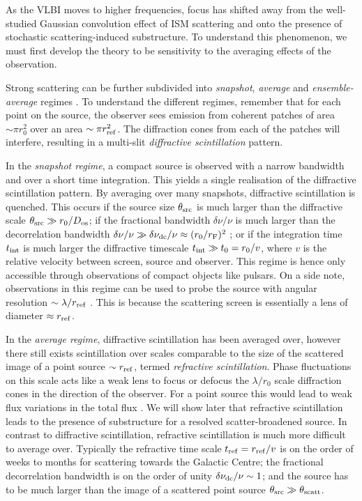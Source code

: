 As the VLBI moves to higher frequencies, focus has shifted away from the well-studied Gaussian convolution effect of ISM scattering and onto the presence of stochastic scattering-induced substructure. To understand this phenomenon, we must first develop the theory to be sensitivity to the averaging effects of the observation. 

Strong scattering can be further subdivided into \emph{snapshot}, \emph{average} and \emph{ensemble-average} regimes \citep*{Narayan_1989,Goodman_1989}. To understand the different regimes, remember that for each point on the source, the observer sees emission from coherent patches of area $\sim \pi r_0^2$ over an area $\sim \pi r_{\rm ref}^2$. The diffraction cones from each of the patches will interfere, resulting in a multi-slit \emph{diffractive scintillation} pattern. 

In the \emph{snapshot regime}, a compact source is observed with a narrow bandwidth and over a short time integration. This yields a single realisation of the diffractive scintillation pattern. By averaging over many snapshots, diffractive scintillation is quenched. This occurs if the source size $\theta_{\rm src}$ is much larger than the diffractive scale $\theta_{\rm src} \gg r_0/D_{\rm os}$; if the fractional bandwidth $\delta \nu/\nu$ is much larger than the decorrelation bandwidth $\delta \nu/\nu \gg \delta \nu_{\rm dc}/\nu \approx (r_0/r_{\rm F})^2$ \citep{Narayan_1992}; or if the integration time $t_{\rm int}$ is much larger the diffractive timescale $t_{\rm int} \gg t_{\rm 0} = r_0/v$, where $v$ is the relative velocity between screen, source and observer. This regime is hence only accessible through observations of compact objects like pulsars. On a side note, observations in this regime can be used to probe the source with angular resolution $\sim \lambda /r_{\rm ref}$ \citep[e.g.][]{Gwinn_2012}. This is because the scattering screen is essentially a lens of diameter $\approx r_{\rm ref}$.

In the \emph{average regime}, diffractive scintillation has been averaged over, however there still exists scintillation over scales comparable to the size of the scattered image of a point source $\sim r_{\rm ref}$, termed \emph{refractive scintillation}. Phase fluctuations on this scale acts like a weak lens to focus or defocus the $\lambda/ r_0$ scale diffraction cones in the direction of the observer. For a point source this would lead to weak flux variations in the total flux \citep{Narayan_1992}. We will show later that refractive scintillation leads to the presence of substructure for a resolved scatter-broadened source. In contrast to diffractive scintillation, refractive scintillation is much more difficult to average over. Typically the refractive time scale $t_{\rm ref} = r_{\rm ref}/v$ is on the order of weeks to months for scattering towards the Galactic Centre; the fractional decorrelation bandwidth is on the order of unity $\delta \nu_{\rm dc}/\nu \sim 1$; and the source has to be much larger than the image of a scattered point source $\theta_{\rm src} \gg \theta_{\rm scatt}$. 


